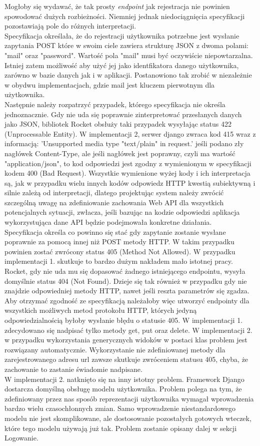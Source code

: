 \documentclass[12pt, notitlepage]{article}
\begin{document}
Mogłoby się wydawać, że tak prosty \textsl{endpoint} jak rejestracja nie powinien spowodować dużych rozbieżności. Niemniej jednak niedociągnięcia specyfikacji pozostawiają pole do różnych interpretacji.\\
Specyfikacja określała, że do rejestracji użytkownika potrzebne jest wysłanie zapytania POST które w swoim ciele zawiera strukturę JSON z dwoma polami: "mail" oraz "password". Wartość pola "mail" musi być oczywiście niepowtarzalna. Istniej zatem możliwość aby użyć jej jako identfikatora danego użytkownika, zarówno w bazie danych jak i w aplikacji. Postanowiono tak zrobić w niezależnie w obydwu implementacjach, gdzie mail jest kluczem pierwotnym dla użytkownika. \\
Następnie należy rozpatrzyć przypadek, którego specyfikacja nie określa jednoznacznie. Gdy nie uda się poprawnie zinterpretować przesłanych danych jako JSON, bibliotek Rocket obsłuży taki przypadek wysyłając status 422 (Unprocessable Entity). W implementacji 2, serwer django zwraca kod 415 wraz z informacją: 'Unsupported media type "text/plain" in request.' jeśli podano zły nagłówek Content-Type, ale jeśli nagłówek jest poprawny, czyli ma wartość "application/json", to kod odpowiedzi jest zgodny z wymienionym w specyfikacji kodem 400 (Bad Request). Wszystkie wymienione wyżej kody i ich interpretacja są, jak w przypadku wielu innych kodów odpowiedz HTTP kwestią subiektywną i silnie zależą od interpretacji, dlatego projektując system należy zwrócić szczególną uwagę na zdefiniowanie zachowania Web API dla wszystkich potencjalnych sytuacji, zwłacza, jeśli bazując na kodzie odpowiedzi aplikacja wykorzystująca dane API będzie podejmowała konkretne działania. \\
Specyfikacja określa co powinno się stać gdy zapytanie zostanie wysłane poprawnie za pomocą innej niż POST metody HTTP. W takim przypadku powinien zostać zwrócony status 405 (Method Not Allowed). W przypadku implementacji 1. skutkuje to bardzo dużym nakładem mało istotnej pracy. Rocket, gdy nie uda mu się dopasować żadnego istniejącego endpointu, wysyła domyślnie status 404 (Not Found). Dzieje się tak również w przypadku gdy nie znajdzie odpowiedniej metody HTTP, nawet jeśli reszta parametrów się zgadza. Aby otrzymać zgodność ze specyfikacją należałoby więc utworzyć endpointy dla wszystkich możliwych metod protokołu HTTP, których jedyną odpowiedzialnością byłoby wysłanie błędu o statusie 405. W implementacji 1. zdecydowano się nadpisać tylko metody get, put oraz delete. W implementacji 2. w przypadku wykorzystania generycznych widoków w postaci klas problem jest rozwiązany automatycznie. Wykorzystanie nie zdefiniowanej metody dla zarejestrowanego adresu url zawsze skutkuje zwróceniem statusu 405, chyba, że zachowanie to zastanie świadomie nadpisane. \\
W implementacji 2. natknięto się na inny istotny problem. Framework Django dostarcza domyślną obsługę modelu użytkownika. Problem polega na tym, że zdefiniowany przez nas sposób reprezentacji użytkownika wymagał wprowadzenia bardzo wielu czasochłonnych zmian. Samo wprowadzenie niestandardowego modelu nie jest skomplikowane, ale dostosowanie pozostałych gotowych wteczek, które tego modelu używają już tak. Problem zostanie opisany dalej w sekcji Logowanie.
\end{document}
